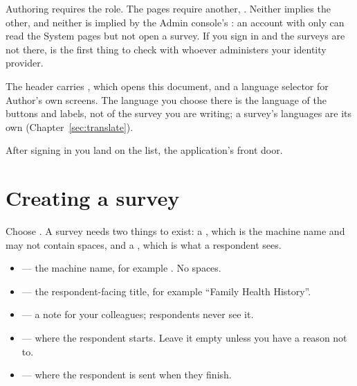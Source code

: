 \documentclass[11pt, a4paper]{article}
\begin{document}

Authoring requires the  role. The  pages require another,
. Neither implies the other, and neither is implied by the Admin
console's : an account with only  can read the System
pages but not open a survey. If you sign in and the surveys are not there,  is
the first thing to check with whoever administers your identity provider.

The header carries , which opens this document, and a language selector for Author's
own screens. The language you choose there is the language of the buttons and labels, not of the
survey you are writing; a survey's languages are its own (Chapter~\ref{sec:translate}).

After signing in you land on the  list, the application's front door.


\section{Creating a survey}
\label{sec:create}

Choose . A survey needs two things to exist: a , which is the machine
name and may not contain spaces, and a , which is what a respondent sees.


\begin{itemize}
  \item {} — the machine name, for example . No spaces.
  \item {} — the respondent-facing title, for example “Family Health History”.
  \item {} — a note for your colleagues; respondents never see it.
  \item {} — where the respondent starts. Leave it empty unless you have a
        reason not to.
  \item {} — where the respondent is sent when they finish.
\end{itemize}
\end{document}
